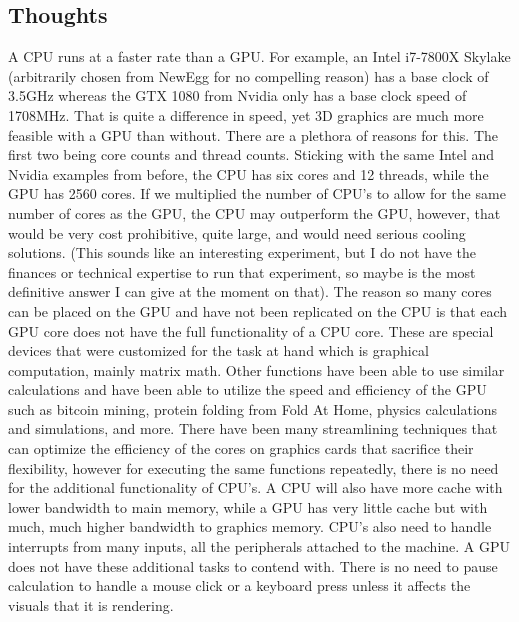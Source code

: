 \documentclass[a4paper]{article}
\begin{document}
\subsection{Thoughts}
	A CPU runs at a faster rate than a GPU.  For example, an Intel i7-7800X Skylake (arbitrarily chosen from NewEgg for no compelling reason) has a base clock of 3.5GHz whereas the GTX 1080 from Nvidia only has a base clock speed of 1708MHz.  That is quite a difference in speed, yet 3D graphics are much more feasible with a GPU than without.  There are a plethora of reasons for this.  The first two being core counts and thread counts.  Sticking with the same Intel and Nvidia examples from before, the CPU has six cores and 12 threads, while the GPU has 2560 cores.  If we multiplied the number of CPU's to allow for the same number of cores as the GPU, the CPU may outperform the GPU, however, that would be very cost prohibitive, quite large, and would need serious cooling solutions.  (This sounds like an interesting experiment, but I do not have the finances or technical expertise to run that experiment, so maybe is the most definitive answer I can give at the moment on that).  
    The reason so many cores can be placed on the GPU and have not been replicated on the CPU is that each GPU core does not have the full functionality of a CPU core.  These are special devices that were customized for the task at hand which is graphical computation, mainly matrix math.  Other functions have been able to use similar calculations and have been able to utilize the speed and efficiency of the GPU such as bitcoin mining, protein folding from Fold At Home, physics calculations and simulations, and more.  There have been many streamlining techniques that can optimize the efficiency of the cores on graphics cards that sacrifice their flexibility, however for executing the same functions repeatedly, there is no need for the additional functionality of CPU's.  A CPU will also have more cache with lower bandwidth to main memory, while a GPU has very little cache but with much, much higher bandwidth to graphics memory.  CPU's also need to handle interrupts from many inputs, all the peripherals attached to the machine.  A GPU does not have these additional tasks to contend with.  There is no need to pause calculation to handle a mouse click or a keyboard press unless it affects the visuals that it is rendering.
\end{document}
